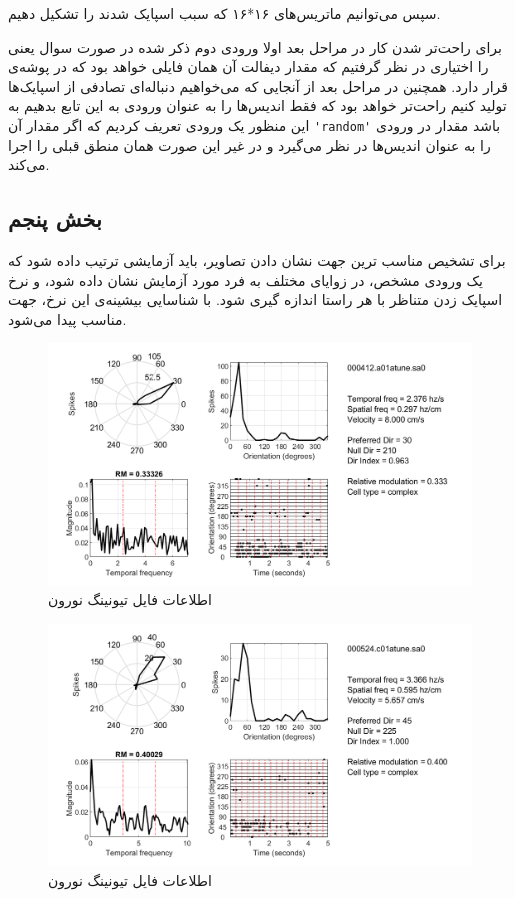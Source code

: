 \documentclass[12pt,onecolumn,a4paper,fleqn]{article}
\begin{document}
سپس می‌توانیم ماتریس‌های ۱۶*۱۶ که سبب اسپایک شدند را تشکیل دهیم.

برای راحت‌تر شدن کار در مراحل بعد اولا ورودی دوم ذکر شده در صورت سوال یعنی  را اختیاری در نظر گرفتیم که مقدار دیفالت آن همان فایلی خواهد بود که در پوشه‌ی  قرار دارد. همچنین در مراحل بعد از آنجایی که می‌خواهیم دنباله‌ای تصادفی از اسپایک‌ها تولید کنیم راحت‌تر خواهد بود که فقط اندیس‌ها را به عنوان ورودی به این تابع بدهیم به این منظور یک ورودی  تعریف کردیم که اگر مقدار آن 
\lstinline[style=Matlab-editor, tabsize=2]{'random'}
باشد مقدار  در ورودی را به عنوان اندیس‌ها در نظر می‌گیرد و در غیر این صورت همان منطق قبلی را اجرا می‌کند.

\subsection{بخش پنجم}
برای تشخیص مناسب ترین جهت نشان دادن تصاویر، باید آزمایشی ترتیب داده شود که یک ورودی مشخص، در زوایای مختلف به فرد مورد آزمایش نشان داده شود، و نرخ اسپایک زدن متناظر با هر راستا اندازه گیری شود. با شناسایی بیشینه‌ی این نرخ، جهت مناسب پیدا می‌شود.

\begin{figure}[h]
	\centering
	\includegraphics[width=0.85\linewidth]{photos/4_5_000412_a01.png}
	\caption{اطلاعات فایل تیونینگ نورون }
\end{figure}
		 
\begin{figure}[h]
	\centering
	\includegraphics[width=0.85\linewidth]{photos/4_5_000524_c01.png}
	\caption{اطلاعات فایل تیونینگ نورون }
\end{figure}		 
\end{document}
